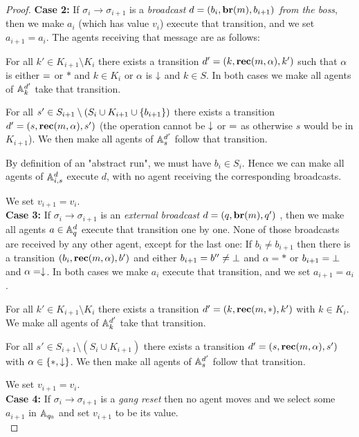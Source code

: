 \begin{proof}
	\textbf{Case 2: }If $\sigma_i \to \sigma_{i+1}$ is a \emph{broadcast $d = (b_i, \textbf{br}(m), b_{i+1})$ from the boss}, then we make $a_i$ (which has value $v_i$) execute that transition, and we set $a_{i+1} = a_i$.
	The agents receiving that message are as follows:
	
	For all $k' \in K_{i+1} \setminus K_i $ there exists a transition $d'=(k, \textbf{rec}(m, \alpha), k')$ such that $\alpha$ is either ${=}$ or $*$ and $k \in K_i$ or $\alpha$ is $\downarrow$ and $k\in S$.
	In both cases we make all agents of $\mathbb{A}_k^{d'}$ take that transition.
	
	For all $s' \in S_{i+1} \setminus (S_i \cup K_{i+1} \cup \{b_{i+1}\})$ there exists a transition $d'=(s,\textbf{rec}(m, \alpha),s')$ (the operation cannot be $\downarrow$ or ${=}$ as otherwise $s$ would be in $K_{i+1}$). We then make all agents of $\mathbb{A}_s^{d'}$ follow that transition. 
	
	By definition of an "abstract run", we must have $b_i \in S_i$.
	Hence we can make all agents of $\mathbb{A}_{i,s}^{d}$ execute $d$, with no agent receiving the corresponding broadcasts.
	
	We set $v_{i+1} = v_i$.
	\\
	
	\textbf{Case 3: } If $\sigma_i \to \sigma_{i+1}$ is an \emph{external broadcast} $d = (q, \textbf{br}(m), q')$ , then we make all agents $a \in \mathbb{A}_q^{d}$ execute that transition one by one. None of those broadcasts are received by any other agent, except for the last one:
	If $b_i \neq b_{i+1}$ then there is a transition $(b_i, \textbf{rec}(m, \alpha), b')$ and either $b_{i+1} = b'' \neq \bot$ and $\alpha = *$ or $b_{i+1} = \bot$ and $\alpha=\downarrow$. In both cases we make $a_i$ execute that transition, and we set $a_{i+1} = a_i$.
	
	For all $k' \in K_{i+1} \setminus K_i$ there exists a transition $d'=(k, \textbf{rec}(m, *), k')$ with $k \in K_i$. We make all agents of $\mathbb{A}_k^{d'}$ take that transition.
	
	For all $s' \in S_{i+1} \setminus (S_i \cup K_{i+1})$ there exists a transition $d'=(s,\textbf{rec}(m, \alpha),s')$ with $\alpha \in \{*, \downarrow\}$. We then make all agents of $\mathbb{A}_s^{d'}$ follow that transition. 
	
	We set $v_{i+1} = v_i$.
	\\
	
	\textbf{Case 4: }  If $\sigma_i \to \sigma_{i+1}$ is a \emph{gang reset} then no agent moves and we select some $a_{i+1}$ in $\mathbb{A}_{q_0}$ and set $v_{i+1}$ to be its value.
	\\
	

\end{proof}
